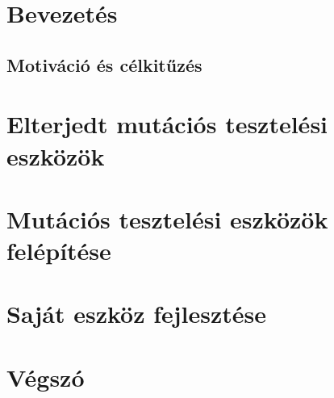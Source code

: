 
\section{Bevezetés}
\subsection{Motiváció és célkitűzés}

\section{Elterjedt mutációs tesztelési eszközök}
\section{Mutációs tesztelési eszközök felépítése}
\section{Saját eszköz fejlesztése}

\section{Végszó}
